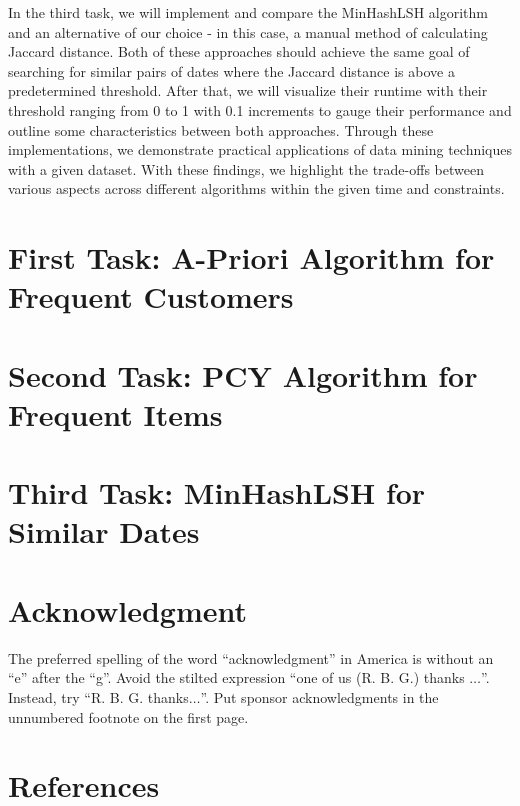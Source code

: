 \documentclass[conference]{IEEEtran}
\begin{document}
    In the third task, we will implement and compare the MinHashLSH algorithm and an alternative of our choice - in this case, a manual method of calculating Jaccard distance.
    Both of these approaches should achieve the same goal of searching for similar pairs of dates where the Jaccard distance is above a predetermined threshold.
    After that, we will visualize their runtime with their threshold ranging from 0 to 1 with 0.1 increments to gauge their performance and outline some characteristics between both approaches.
    Through these implementations, we demonstrate practical applications of data mining techniques with a given dataset.
    With these findings, we highlight the trade-offs between various aspects across different algorithms within the given time and constraints.

    \section{First Task: A-Priori Algorithm for Frequent Customers}
    \label{sec:first-task}
    

    \section{Second Task: PCY Algorithm for Frequent Items}
    \label{sec:second-task}
    

    \section{Third Task: MinHashLSH for Similar Dates}
    \label{sec:third-task}
    

    \section*{Acknowledgment}

    The preferred spelling of the word ``acknowledgment'' in America is without an ``e'' after the ``g''.
    Avoid the stilted expression ``one of us (R. B. G.) thanks $\ldots$''.
    Instead, try ``R. B. G. thanks$\ldots$''.
    Put sponsor acknowledgments in the unnumbered footnote on the first page.

    \section*{References}
\end{document}
